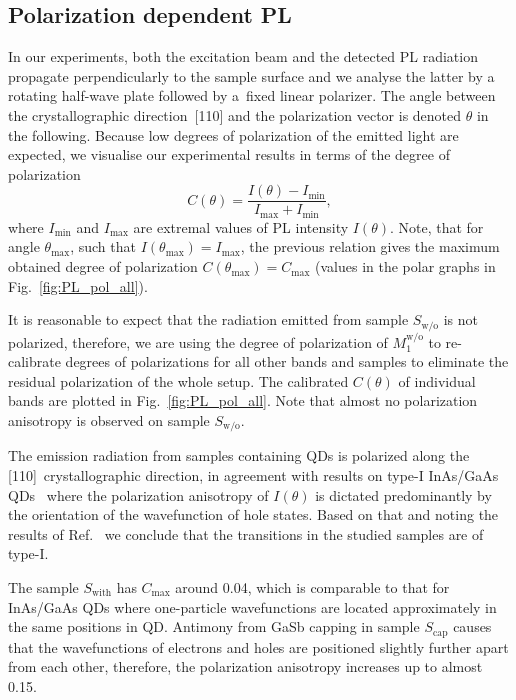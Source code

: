 \subsection{Polarization dependent PL }
In our experiments, both the excitation beam and the detected PL radiation propagate perpendicularly to the sample surface and we analyse the latter by a rotating half-wave plate followed by a~fixed linear polarizer. The angle between the crystallographic direction~[110] and the polarization vector is denoted $\theta$ in the following. Because low degrees of polarization of the emitted light are expected, we visualise our experimental results in terms of the degree of polarization
%
\begin{equation}
C(\theta)=\frac{I(\theta)-I_\mathrm{min}}{I_\mathrm{max}+I_\mathrm{min}},
\end{equation}
%
where $I_\mathrm{min}$ and $I_\mathrm{max}$ are extremal values of PL intensity $I(\theta)$. Note, that for angle $\theta_\mathrm{max}$, such that $I(\theta_\mathrm{max})=I_\mathrm{max}$, the previous relation gives the maximum obtained degree of polarization $C(\theta_\mathrm{max})=C_\mathrm{max}$ (values in the polar graphs in Fig.~\ref{fig:PL_pol_all}).

It is reasonable to expect that the radiation emitted from sample ${S_\mathrm{w/o}}$ is not polarized, therefore, we are using the degree of polarization of $M_1^\mathrm{w/o}$ to re-calibrate degrees of polarizations for all other bands and samples to eliminate the residual polarization of the whole setup. The calibrated $C(\theta)$ of individual bands are plotted in Fig.~\ref{fig:PL_pol_all}. Note that almost no polarization anisotropy is observed on sample ${S_\mathrm{w/o}}$.

The emission radiation from samples containing QDs is polarized along the [110]~crystallographic direction, in agreement with results on type-I InAs/GaAs QDs~\citep{HumPhysE} where the polarization anisotropy of $I(\theta)$ is dictated predominantly by the orientation of the wavefunction of hole states. Based on that and noting the results of Ref.~\citep{Klenovsky2015} we conclude that the transitions in the studied samples are of type-I.

  The sample ${S_\mathrm{with}}$ has $C_\mathrm{max}$ around 0.04, which is comparable to that for InAs/GaAs QDs where one-particle wavefunctions are located approximately in the same positions in QD. Antimony from GaSb capping in sample ${S_\mathrm{cap}}$ causes that the wavefunctions of electrons and holes are positioned slightly further apart from each other, therefore, the polarization anisotropy increases up to almost 0.15.
  
